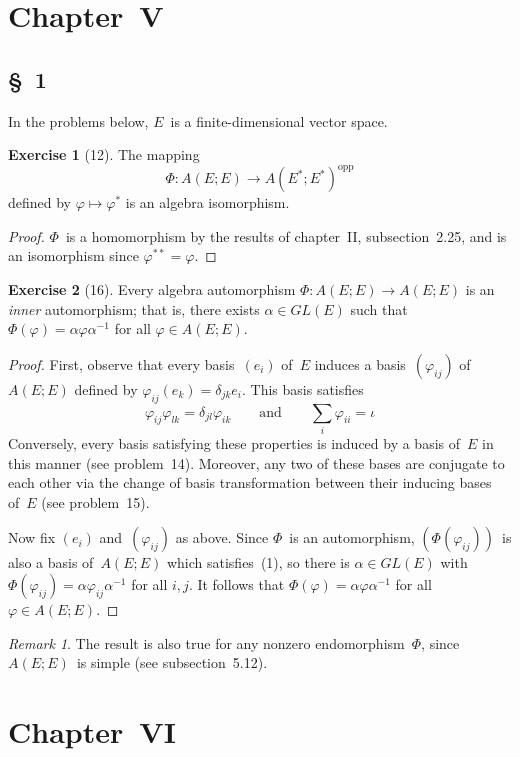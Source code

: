 \documentclass[letterpaper,12pt]{article}
\newcommand{\opp}[1]{#1^{\mathrm{opp}}}
\theoremstyle{definition}
\newtheorem*{exer}{Exercise}
\theoremstyle{remark}
\newtheorem*{rmk}{Remark}
\begin{document}
\section*{Chapter~V}
\subsection*{\S~1}
In the problems below, \(E\)~is a finite-dimensional vector space.
\begin{exer}[12]
The mapping
\[\Phi:A(E;E)\to\opp{A(E^*;E^*)}\]
defined by \(\varphi\mapsto\varphi^*\) is an algebra isomorphism.
\end{exer}
\begin{proof}
\(\Phi\)~is a homomorphism by the results of chapter~II, subsection~2.25, and is an isomorphism since \(\varphi^{**}=\varphi\).
\end{proof}

\begin{exer}[16]
Every algebra automorphism \(\Phi:A(E;E)\to A(E;E)\) is an \emph{inner} automorphism; that is, there exists \(\alpha\in GL(E)\) such that \(\Phi(\varphi)=\alpha\varphi\alpha^{-1}\) for all \(\varphi\in A(E;E)\).
\end{exer}
\begin{proof}
First, observe that every basis~\((e_i)\) of~\(E\) induces a basis~\((\varphi_{ij})\) of~\(A(E;E)\) defined by \(\varphi_{ij}(e_k)=\delta_{jk}e_i\). This basis satisfies
\[\varphi_{ij}\varphi_{lk}=\delta_{jl}\varphi_{ik}\qquad\text{and}\qquad\sum_i\varphi_{ii}=\iota\tag{1}\]
Conversely, every basis satisfying these properties is induced by a basis of~\(E\) in this manner (see problem~14). Moreover, any two of these bases are conjugate to each other via the change of basis transformation between their inducing bases of~\(E\) (see problem~15).

Now fix \((e_i)\) and~\((\varphi_{ij})\) as above. Since \(\Phi\)~is an automorphism, \((\Phi(\varphi_{ij}))\)~is also a basis of~\(A(E;E)\) which satisfies~(1), so there is \(\alpha\in GL(E)\) with \(\Phi(\varphi_{ij})=\alpha\varphi_{ij}\alpha^{-1}\) for all \(i,j\). It follows that \(\Phi(\varphi)=\alpha\varphi\alpha^{-1}\) for all \(\varphi\in A(E;E)\).
\end{proof}
\begin{rmk}
The result is also true for any nonzero endomorphism~\(\Phi\), since \(A(E;E)\)~is simple (see subsection~5.12).
\end{rmk}

\section*{Chapter~VI}
\end{document}
